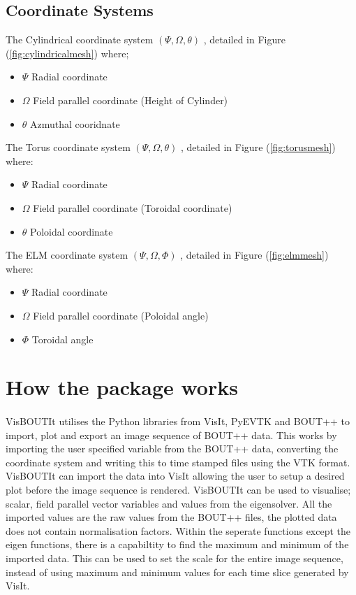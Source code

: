 \documentclass[12pt,a4paper]{article}
\begin{document}
\subsection{Coordinate Systems}
The Cylindrical coordinate system $(\Psi , \Omega , \theta )$ , detailed in Figure (\ref{fig:cylindricalmesh}) where;
\begin{itemize}
	\item{$\Psi$ Radial coordinate}
	\item{$\Omega$ Field parallel coordinate (Height of Cylinder)}
	\item{$\theta$ Azmuthal cooridnate}
\end{itemize}
The Torus coordinate system $(\Psi, \Omega, \theta)$ , detailed in Figure (\ref{fig:torusmesh}) where:
\begin{itemize}
	\item{$\Psi$ Radial coordinate}
	\item{$\Omega$ Field parallel coordinate (Toroidal coordinate)}
	\item{$\theta$ Poloidal coordinate}
\end{itemize}
The ELM coordinate system $(\Psi,\Omega, \Phi)$ , detailed in Figure (\ref{fig:elmmesh}) where:
\begin{itemize}
	\item{$\Psi$ Radial coordinate}
	\item{$\Omega$ Field parallel coordinate (Poloidal angle)}
	\item{$\Phi$ Toroidal angle}
\end{itemize}
		
\section{How the package works}
		
	\paragraph{}
	VisBOUTIt utilises the Python libraries from VisIt, PyEVTK and BOUT++ to import, plot and export an image sequence of BOUT++ data. This works by importing the user specified variable from the BOUT++ data, converting the coordinate system and writing this to time stamped files using the VTK format. VisBOUTIt can import the data into VisIt allowing the user to setup a desired plot before the image sequence is rendered. VisBOUTIt can be used to visualise; scalar, field parallel vector variables and values from the eigensolver. All the  imported values are the raw values from the BOUT++ files, the plotted data does not contain normalisation factors. Within the seperate functions except the eigen functions, there is a capabiltity to find the maximum and minimum of the imported data. This can be used to set the scale for the entire image sequence, instead of using maximum and minimum values for each time slice generated by VisIt.	
\end{document}
